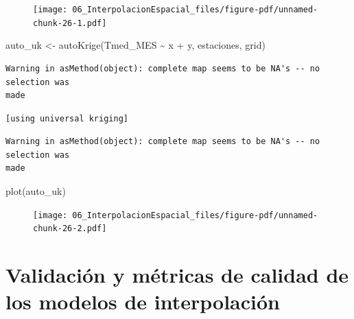 \documentclass[
  letterpaper,
  DIV=11,
  numbers=noendperiod]{scrreprt}
\newenvironment{Shaded}{\begin{snugshade}}{\end{snugshade}}
\newcommand{\FunctionTok}[1]{\textcolor[rgb]{0.28,0.35,0.67}{#1}}
\newcommand{\NormalTok}[1]{\textcolor[rgb]{0.00,0.23,0.31}{#1}}
\newcommand{\OtherTok}[1]{\textcolor[rgb]{0.00,0.23,0.31}{#1}}
\newcommand{\SpecialCharTok}[1]{\textcolor[rgb]{0.37,0.37,0.37}{#1}}
\begin{document}
\begin{figure}[H]

{\centering \texttt{[image: 06\_InterpolacionEspacial\_files/figure-pdf/unnamed-chunk-26-1.pdf]}

}

\end{figure}

\begin{Shaded}
\begin{Highlighting}[]
\NormalTok{auto\_uk }\OtherTok{\textless{}{-}} \FunctionTok{autoKrige}\NormalTok{(Tmed\_MES }\SpecialCharTok{\textasciitilde{}}\NormalTok{ x }\SpecialCharTok{+}\NormalTok{ y, estaciones,  grid)}
\end{Highlighting}
\end{Shaded}

\begin{verbatim}
Warning in asMethod(object): complete map seems to be NA's -- no selection was
made
\end{verbatim}

\begin{verbatim}
[using universal kriging]
\end{verbatim}

\begin{verbatim}
Warning in asMethod(object): complete map seems to be NA's -- no selection was
made
\end{verbatim}

\begin{Shaded}
\begin{Highlighting}[]
\FunctionTok{plot}\NormalTok{(auto\_uk)}
\end{Highlighting}
\end{Shaded}

\begin{figure}[H]

{\centering \texttt{[image: 06\_InterpolacionEspacial\_files/figure-pdf/unnamed-chunk-26-2.pdf]}

}

\end{figure}

\hypertarget{validaciuxf3n-y-muxe9tricas-de-calidad-de-los-modelos-de-interpolaciuxf3n}{%
\section{Validación y métricas de calidad de los modelos de
interpolación}\label{validaciuxf3n-y-muxe9tricas-de-calidad-de-los-modelos-de-interpolaciuxf3n}}
\end{document}
